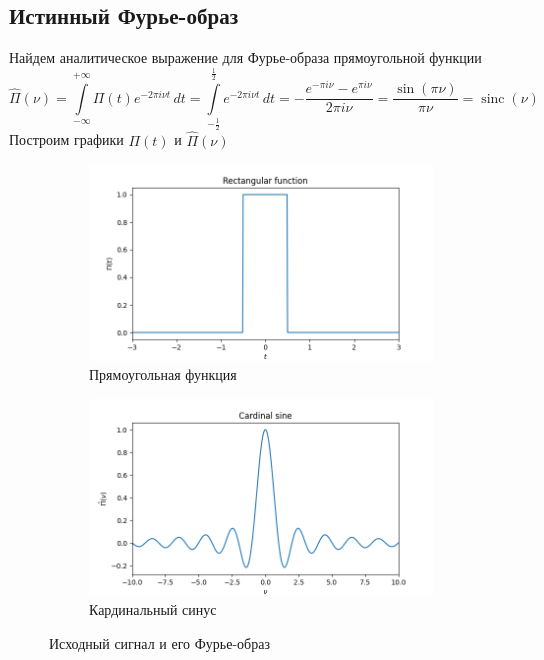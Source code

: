 \documentclass[a4paper, 12pt]{article}
\DeclareMathOperator{\sinc}{sinc}
\begin{document}
    \subsection{Истинный Фурье-образ}
    Найдем аналитическое выражение для Фурье-образа прямоугольной функции
    $$\hat{\Pi}(\nu)=\int\limits_{-\infty}^{+\infty}\Pi(t)e^{-2\pi i \nu t}\,dt=\int\limits_{-\frac{1}{2}}^{\frac{1}{2}}e^{-2\pi i \nu t}\,dt
    =-\dfrac{e^{-\pi i \nu}-e^{\pi i \nu}}{2\pi i\nu}=\dfrac{\sin{\left(\pi\nu\right)}}{\pi\nu}=\sinc{\left(\nu\right)}$$
    Построим графики $\Pi(t)$ и $\hat{\Pi}(\nu)$
    \begin{figure}[H]
        \centering
        \begin{subfigure}{0.45\textwidth}
            \centering
            \includegraphics[width=\linewidth]{rectf.png}
            \caption{Прямоугольная функция}
            \label{fig:rectf}
        \end{subfigure}
        \hspace{5mm}
        \begin{subfigure}{0.45\textwidth}
            \centering
            \includegraphics[width=\linewidth]{sinc.png}
            \caption{Кардинальный синус}
            \label{fig:sinc}
        \end{subfigure}
        \caption{Исходный сигнал и его Фурье-образ}
        \label{fig:rectfsinc}
    \end{figure}
\end{document}

